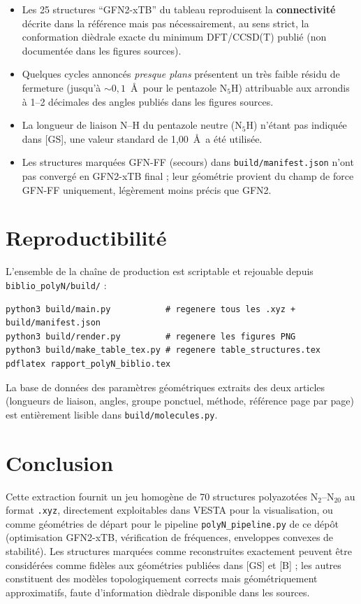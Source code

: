 \documentclass[11pt,a4paper]{article}
\begin{document}
\begin{itemize}
  \item Les 25 structures ``GFN2-xTB'' du tableau reproduisent la
  \textbf{connectivit\'e} d\'ecrite dans la r\'ef\'erence mais pas
  n\'ecessairement, au sens strict, la conformation di\`edrale exacte du
  minimum DFT/CCSD(T) publi\'e (non document\'ee dans les figures sources).
  \item Quelques cycles annonc\'es \textit{presque plans} pr\'esentent un
  tr\`es faible r\'esidu de fermeture (jusqu'\`a $\sim0{,}1$~\AA\ pour le
  pentazole N$_5$H) attribuable aux arrondis \`a 1--2 d\'ecimales des
  angles publi\'es dans les figures sources.
  \item La longueur de liaison N--H du pentazole neutre (N$_5$H) n'\'etant
  pas indiqu\'ee dans [GS], une valeur standard de 1{,}00~\AA\ a \'et\'e
  utilis\'ee.
  \item Les structures marqu\'ees GFN-FF (secours) dans
  \texttt{build/manifest.json} n'ont pas converg\'e en GFN2-xTB final ; leur
  g\'eom\'etrie provient du champ de force GFN-FF uniquement, l\'eg\`erement
  moins pr\'ecis que GFN2.
\end{itemize}

\section{Reproductibilit\'e}

L'ensemble de la cha\^ine de production est scriptable et rejouable depuis
\texttt{biblio\_polyN/build/} :
\begin{verbatim}
python3 build/main.py           # regenere tous les .xyz + build/manifest.json
python3 build/render.py         # regenere les figures PNG
python3 build/make_table_tex.py # regenere table_structures.tex
pdflatex rapport_polyN_biblio.tex
\end{verbatim}
La base de donn\'ees des param\`etres g\'eom\'etriques extraits des deux
articles (longueurs de liaison, angles, groupe ponctuel, m\'ethode,
r\'ef\'erence page par page) est enti\`erement lisible dans
\texttt{build/molecules.py}.

\section{Conclusion}

Cette extraction fournit un jeu homog\`ene de 70 structures polyazot\'ees
N$_2$--N$_{20}$ au format \texttt{.xyz}, directement exploitables dans
VESTA pour la visualisation, ou comme g\'eom\'etries de d\'epart pour le
pipeline \texttt{polyN\_pipeline.py} de ce d\'ep\^ot (optimisation
GFN2-xTB, v\'erification de fr\'equences, enveloppes convexes de
stabilit\'e). Les structures marqu\'ees comme reconstruites exactement
peuvent \^etre consid\'er\'ees comme fid\`eles aux g\'eom\'etries publi\'ees
dans [GS] et [B] ; les autres constituent des mod\`eles topologiquement
corrects mais g\'eom\'etriquement approximatifs, faute d'information
di\`edrale disponible dans les sources.
\end{document}
